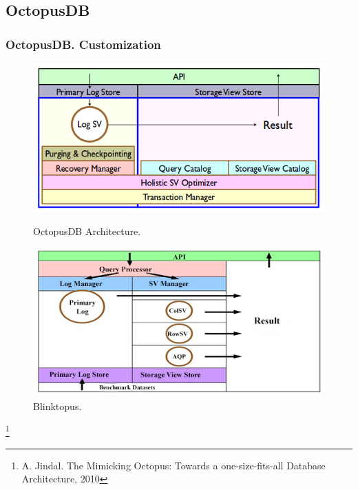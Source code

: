 \documentclass{beamer}
\begin{document}
\subsection{OctopusDB}
\begin{frame}
\frametitle{OctopusDB. Customization}
\begin{figure}
\centering
\begin{minipage}{.5\textwidth}
  \centering
  \includegraphics[scale=0.25]{img/octopus_arch.png}
  \caption{\fontsize{8}{5}\selectfont OctopusDB Architecture.}
\end{minipage}%
\pause
\begin{minipage}{.5\textwidth}
  \centering
  \includegraphics[scale=0.25]{img/Blinktopus-OctopusPart.jpg}
	\caption{\fontsize{8}{5}\selectfont Blinktopus.}
\end{minipage}
\end{figure}
\footnote{\fontsize{5}{5}\selectfont A. Jindal. The Mimicking Octopus: Towards a one-size-fits-all Database Architecture, 2010}
\end{frame}
\end{document}

